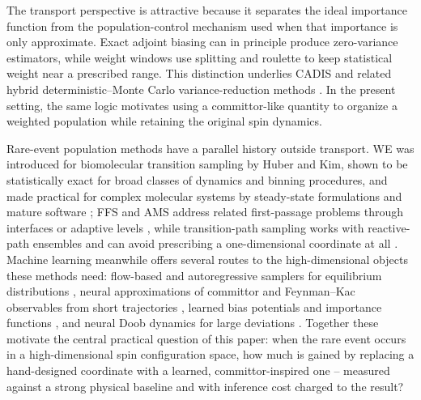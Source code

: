 \documentclass[a4paper,fleqn]{cas-sc}
\begin{document}
The transport perspective is attractive because it separates the ideal importance function
from the population-control mechanism used when that importance is only approximate. Exact
adjoint biasing can in principle produce zero-variance estimators, while weight windows use
splitting and roulette to keep statistical weight near a prescribed range. This distinction
underlies CADIS and related hybrid deterministic--Monte Carlo variance-reduction methods
\citep{wagner1998,haghighat2003,wagnerfw2014}. In the present setting, the same logic
motivates using a committor-like quantity to organize a weighted population while retaining
the original spin dynamics.

Rare-event population methods have a parallel history outside transport. WE was introduced
for biomolecular transition sampling by Huber and Kim, shown to be statistically exact for
broad classes of dynamics and binning procedures, and made practical for complex molecular
systems by steady-state formulations and mature software
\citep{huber1996,zhang2010,bhatt2010,russo2022}; FFS and AMS address related first-passage
problems through interfaces or adaptive levels \citep{allen2009,valeriani2007,cerou2007},
while transition-path sampling works with reactive-path ensembles and can avoid prescribing a
one-dimensional coordinate at all \citep{dellago1998,bolhuis2002}. Machine learning
meanwhile offers several routes to the high-dimensional objects these methods need: flow-based
and autoregressive samplers for equilibrium distributions
\citep{wu2019,noe2019,nicoli2020,gabrie2022}, neural approximations of committor and
Feynman--Kac observables from short trajectories \citep{khoo2019,strahan2023}, learned bias
potentials and importance functions \citep{hua2024,kimcai2026}, and neural Doob dynamics for
large deviations \citep{zhao2025}. Together these motivate the central practical question of
this paper: when the rare event occurs in a high-dimensional spin configuration space, how much
is gained by replacing a hand-designed coordinate with a learned, committor-inspired one --
measured against a strong physical baseline and with inference cost charged to the result?
\end{document}
